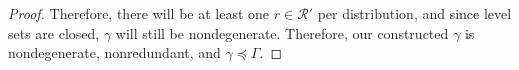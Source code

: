 \documentclass[12pt]{article}
\newcommand{\Comments}{1}
\newcommand{\mynote}[2]{\ifnum\Comments=1\textcolor{#1}{#2}\fi}
\newcommand{\jessie}[1]{\mynote{purple}{[JF: #1]}}
\newcommand{\R}{\mathcal{R}}
\newcommand{\inter}[1]{\mathring{#1}}%
\begin{document}
\begin{proof}
	Therefore, there will be at least one $r \in \R'$ per distribution, and since level sets are closed, $\gamma$ will still be nondegenerate.
	Therefore, our constructed $\gamma$ is nondegenerate, nonredundant, and $\gamma \preceq \Gamma$.
	
	
\end{proof}
\end{document}
